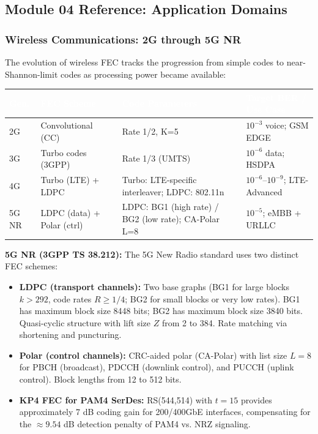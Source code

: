 \documentclass[11pt,letterpaper]{article}
\newcommand{\tableheader}[1]{\textbf{\sffamily\textcolor{white}{#1}}}
\begin{document}
\subsection{Module 04 Reference: Application Domains}

\subsubsection{Wireless Communications: 2G through 5G NR}

The evolution of wireless FEC tracks the progression from simple codes to near-Shannon-limit codes as processing power became available:

\begin{center}
\begin{tabularx}{\textwidth}{C{1.2cm}L{3.5cm}L{4cm}X}
\toprule
{}
\tableheader{Gen.} & \tableheader{FEC Scheme} & \tableheader{Code Parameters} & \tableheader{Target BER / Use Case} \\
\midrule
2G & Convolutional (CC) & Rate 1/2, K=5 & $10^{-3}$ voice; GSM EDGE \\
3G & Turbo codes (3GPP) & Rate 1/3 (UMTS) & $10^{-6}$ data; HSDPA \\
4G & Turbo (LTE) + LDPC & Turbo: LTE-specific interleaver; LDPC: 802.11n & $10^{-6}$--$10^{-9}$; LTE-Advanced \\
5G NR & LDPC (data) + Polar (ctrl) & LDPC: BG1 (high rate) / BG2 (low rate); CA-Polar L=8 & $10^{-5}$; eMBB + URLLC \\
\bottomrule
\end{tabularx}
\end{center}

\textbf{5G NR (3GPP TS 38.212):} The 5G New Radio standard uses two distinct FEC schemes:
\begin{itemize}[leftmargin=*]
  \item \textbf{LDPC (transport channels):} Two base graphs (BG1 for large blocks $k > 292$, code rates $R \geq 1/4$; BG2 for small blocks or very low rates). BG1 has maximum block size 8448 bits; BG2 has maximum block size 3840 bits. Quasi-cyclic structure with lift size $Z$ from 2 to 384. Rate matching via shortening and puncturing.
  \item \textbf{Polar (control channels):} CRC-aided polar (CA-Polar) with list size $L=8$ for PBCH (broadcast), PDCCH (downlink control), and PUCCH (uplink control). Block lengths from 12 to 512 bits.
  \item \textbf{KP4 FEC for PAM4 SerDes:} RS(544,514) with $t=15$ provides approximately 7 dB coding gain for 200/400GbE interfaces, compensating for the $\approx 9.54$ dB detection penalty of PAM4 vs. NRZ signaling.
\end{itemize}
\end{document}
